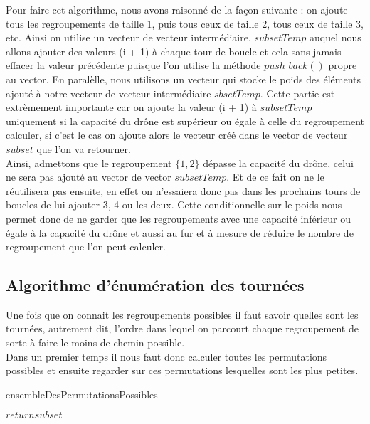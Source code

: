 \documentclass[a4paper,sffamily,12pt]{article}
\begin{document}
				Pour faire cet algorithme, nous avons raisonné de la façon suivante : on ajoute tous les regroupements de taille 1, puis tous ceux de taille 2, tous ceux de taille 3, etc. Ainsi on utilise un vecteur de vecteur intermédiaire, $subsetTemp$ auquel nous allons ajouter des valeurs (i + 1) à chaque tour de boucle et cela sans jamais effacer la valeur précédente puisque l'on utilise la méthode $push\_back()$ propre au vector. En paralèlle, nous utilisons un vecteur qui stocke le poids des éléments ajouté à notre vecteur de vecteur intermédiaire $sbsetTemp$. Cette partie est extrèmement importante car on ajoute la valeur (i + 1) à $subsetTemp$ uniquement si la capacité du drône est supérieur ou égale à celle du regroupement calculer, si c'est le cas on ajoute alors le vecteur créé dans le vector de vecteur $subset$ que l'on va retourner.\\
			\indent Ainsi, admettons que le regroupement $\{1,2\}$ dépasse la capacité du drône, celui ne sera pas ajouté au vector de vector $subsetTemp$. Et de ce fait on ne le réutilisera pas ensuite, en effet on n'essaiera donc pas dans les prochains tours de boucles de lui ajouter 3, 4 ou les deux. Cette conditionnelle sur le poids nous permet donc de ne garder que les regroupements avec une capacité inférieur ou égale à la capacité du drône et aussi au fur et à mesure de réduire le nombre de regroupement que l'on peut calculer.
						
			\newpage

		
		\subsection{Algorithme d'énumération des tournées}	
			
			\vspace{0.5cm}

			Une fois que on connait les regroupements possibles il faut savoir quelles sont les tournées, autrement dit, l'ordre dans lequel on parcourt chaque regroupement de sorte à faire le moins de chemin possible.\\
			\indent Dans un premier temps il nous faut donc calculer toutes les permutations possibles et ensuite regarder sur ces permutations lesquelles sont les plus petites.


			\IncMargin{1em}
			\begin{algorithm}
				\caption{ensembleDesPermutationsPossibles}				
				\BlankLine
				
				$return subset$ \\
			\end{algorithm}\DecMargin{1em}
\end{document}
